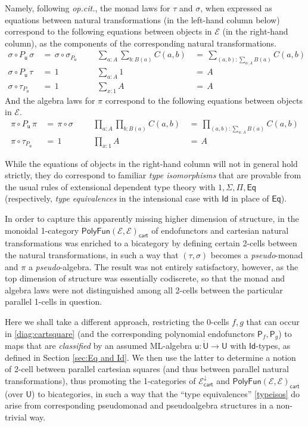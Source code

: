 \documentclass[12pt,reqno]{amsart}
\newcommand{\EE}{\ensuremath{\mathcal{E}}}
\newcommand{\alg}[1]{\ensuremath{\mathsf{#1}}}
\renewcommand{\to}{\ensuremath{\rightarrow}}
\newcommand{\Id}{\mathsf{Id}}
\renewcommand{\t}{\ensuremath{\mathsf{u}}}
\newcommand{\T}{\ensuremath{\mathsf{U}}}
\newcommand{\TT}{\ensuremath{\dot{\mathsf{U}}}}
\theoremstyle{remark}
\theoremstyle{definition}
\begin{document}
Namely, following \emph{op.cit.}, the monad laws for $\tau$ and $\sigma$, when expressed as equations between natural transformations (in the left-hand column below) correspond to the following equations between objects in $\EE$ (in the right-hand column), as the components of the corresponding natural transformations.
\begin{align*}\textstyle
 \sigma\circ P_\t\, \sigma\, &=\, \sigma\circ\sigma_{P_\t}	&&&	\sum\limits_{a:A}\sum\limits_{b:B(a)}C(a,b)\, &=\, \sum\limits_{(a,b):\sum\limits_{a:A}B(a)}C(a,b)\  \\ 
  \sigma\circ P_\t\,\tau\, &=\, 1 		&&& 	\sum\limits_{a:A}1\, &=\, A   \tag{\theequation}\label{typeisos}\\ 
  \sigma\circ \tau_{P_\t}\, &=\, 1		&&& 	\sum\limits_{x:1}A\, &=\, A  
 \end{align*}
%
And the algebra laws for $\pi$ correspond to the following equations between objects in $\EE$.
%
\begin{align*}
 \pi\circ P_\t\,\pi\, &=\,  \pi\circ\sigma 	&&&	\prod\limits_{a:A}\prod\limits_{b:B(a)}C(a,b)\, 
 									&=\, \prod\limits_{(a,b):\sum_{a:A}B(a)}C(a,b)  \\ 
 \pi\circ \tau_{P_\t}\, &=\, 1 	&&& 	\prod\limits_{x:1}A\, &=\, A   \tag{\theequation}
\end{align*}

While the equations of objects in the right-hand column will not in general hold strictly, they do correspond to familiar \emph{type isomorphisms} that are provable from the usual rules of extensional dependent type theory with $1, \Sigma, \Pi, \mathsf{Eq}$ (respectively, \emph{type equivalences} in the intensional case with $\mathsf{Id}$ in place of $\mathsf{Eq}$). 

In order to capture this apparently missing higher dimension of structure, in \cite{Newstead:thesis, NA:2018} the monoidal 1-category $\mathsf{PolyFun}(\EE, \EE)_{\mathsf{cart}}$ of endofunctors and cartesian natural transformations was enriched to a bicategory by defining certain 2-cells between the natural transformations, in such a way that $(\tau, \sigma)$ becomes a \emph{pseudo}-monad and $\pi$ a \emph{pseudo}-algebra.  The result was not entirely satisfactory, however, as the top dimension of structure was essentially codiscrete, so that the monad and algebra laws were not distinguished among all 2-cells between the particular parallel 1-cells in question.

Here we shall take a different approach, restricting the 0-cells $f, g$ that can occur in \eqref{diag:cartsquare} (and the corresponding polynomial endofunctors $\alg{P}_f, \alg{P}_g$) to maps that are  \emph{classified} by an assumed ML-algebra $\t:\TT \to \T$ with $\Id{}$-types, as defined in Section \ref{sec:Eq and Id}. We then use the latter to determine a notion of 2-cell between parallel cartesian squares (and thus between parallel natural transformations), thus promoting the 1-categories of $\EE^{\downarrow}_{\mathsf{cart}}$ and $\mathsf{PolyFun}(\EE, \EE)_{\mathsf{cart}}$ (over $\T$) to bicategories, in such a way that the ``type equivalences'' \eqref{typeisos} do arise from corresponding pseudomonad and pseudoalgebra structures in a non-trivial way.
\end{document}
